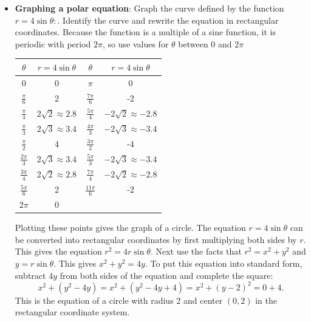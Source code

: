 \documentclass{report}
\begin{document}
\begin{itemize}
    \item \textbf{Graphing a polar equation}: Graph the curve defined by the function $r=4\sin{\theta}:$. Identify the curve and rewrite the equation in rectangular coordinates.
        \bigbreak \noindent 
            Because the function is a multiple of a sine function, it is periodic with period  $2\pi$, so use values for $\theta$ between 0 and  $2\pi$
    \bigbreak \noindent 
    \begin{center}
        \begin{tabular}{cc|cc}
            \toprule
            \( \theta \) & \( r = 4\sin\theta \) & \( \theta \) & \( r = 4\sin\theta \) \\
            \midrule
            0 & 0 & \( \pi \) & 0 \\
            \( \frac{\pi}{6} \) & 2 & \( \frac{7\pi}{6} \) & -2 \\
            \( \frac{\pi}{4} \) & \( 2\sqrt{2} \approx 2.8 \) & \( \frac{5\pi}{4} \) & \( -2\sqrt{2} \approx -2.8 \) \\
            \( \frac{\pi}{3} \) & \( 2\sqrt{3} \approx 3.4 \) & \( \frac{4\pi}{3} \) & \( -2\sqrt{3} \approx -3.4 \) \\
            \( \frac{\pi}{2} \) & 4 & \( \frac{3\pi}{2} \) & -4 \\
            \( \frac{2\pi}{3} \) & \( 2\sqrt{3} \approx 3.4 \) & \( \frac{5\pi}{3} \) & \( -2\sqrt{3} \approx -3.4 \) \\
            \( \frac{3\pi}{4} \) & \( 2\sqrt{2} \approx 2.8 \) & \( \frac{7\pi}{4} \) & \( -2\sqrt{2} \approx -2.8 \) \\
            \( \frac{5\pi}{6} \) & 2 & \( \frac{11\pi}{6} \) & -2 \\
            \( 2\pi \) & 0 \\
            \bottomrule
        \end{tabular}
     \end{center}
     \bigbreak \noindent 
     Plotting these points gives the graph of a circle. The equation \( r = 4\sin\theta \) can be converted into rectangular coordinates by first multiplying both sides by \( r \). This gives the equation \( r^2 = 4r\sin\theta \). Next use the facts that \( r^2 = x^2 + y^2 \) and \( y = r\sin\theta \). This gives \( x^2 + y^2 = 4y \). To put this equation into standard form, subtract \( 4y \) from both sides of the equation and complete the square:
     \[
         x^2 + (y^2 - 4y) = x^2 + (y^2 - 4y + 4) = x^2 + (y - 2)^2 = 0 + 4.
     \]
     This is the equation of a circle with radius 2 and center \( (0, 2) \) in the rectangular coordinate system.


\end{itemize}
\end{document}
